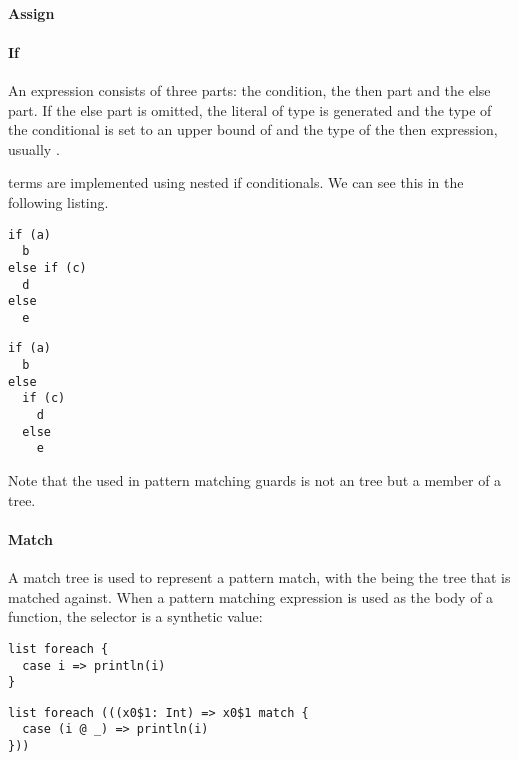 \paragraph{Assign} 

\paragraph{If} 

\noindent An  expression consists of three parts: the condition, the then part and the else part. If the else part is omitted, the literal \src{()} of type  is generated and the type of the conditional is set to an upper bound of  and the type of the then expression, usually .

 terms are implemented using nested if conditionals. We can see this in the following listing.

\begin{multicols}{2}
\begin{lstlisting}
if (a)
  b
else if (c)
  d
else
  e

\end{lstlisting}
\begin{lstlisting}
if (a)
  b
else
  if (c)
    d
  else
    e
\end{lstlisting}
\end{multicols}

Note that the  used in pattern matching guards is not an  tree but a member of a  tree.

\paragraph{Match} 

\noindent A match tree is used to represent a pattern match, with the  being the tree that is matched against. When a pattern matching expression is used as the body of a function, the selector is a synthetic value:

\begin{multicols}{2}
\begin{lstlisting}
list foreach {
  case i => println(i)
}
\end{lstlisting}
\begin{lstlisting}
list foreach (((x0$1: Int) => x0$1 match {
  case (i @ _) => println(i)
}))
\end{lstlisting}
\end{multicols}

